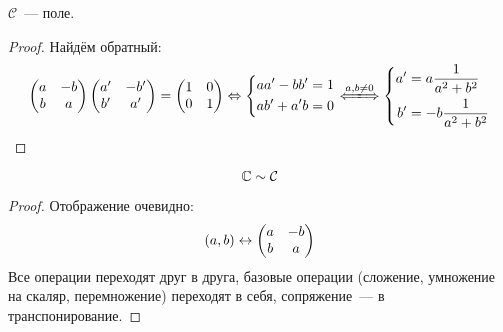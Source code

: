 \begin{assertion}
$\mathcal{C}$~--- поле.
\end{assertion}
\begin{proof}
Найдём обратный:
$$\left(\begin{matrix}a & -b \\ b & a\end{matrix}\right)\left(\begin{matrix}a' & -b' \\ b' & a'\end{matrix}\right) = \left(\begin{matrix}1 & 0 \\ 0 & 1\end{matrix}\right) 
\Lra \left\{\begin{aligned}aa'-bb' &= 1 \\ ab'+a'b &= 0\end{aligned}\right.\xLongleftrightarrow{a, b \ne 0} \left\{\begin{aligned}a' &= a\frac1{a^2+b^2} \\ b' &= -b\frac1{a^2+b^2}\end{aligned}\right.$$
\end{proof}

\begin{assertion}
$$\mathbb{C} \sim \mathcal{C}$$
\end{assertion}
\begin{proof}
Отображение очевидно:
$$(a, b) \leftrightarrow \left(\begin{matrix}a & -b \\ b & a\end{matrix}\right)$$
Все операции переходят друг в друга, базовые операции (сложение, умножение на скаляр, перемножение) переходят в себя, сопряжение~--- в транспонирование.
\end{proof}
